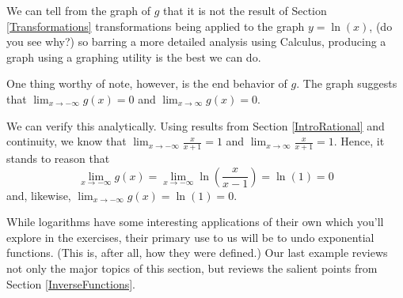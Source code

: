 \documentclass{ximera}
\begin{document}
\begin{example}
\begin{explanation}
\begin{enumerate}
We can tell from the graph of $g$ that it is not the result of Section \ref{Transformations} transformations being applied to the graph $y = \ln(x)$, (do you see why?)  so barring a more detailed analysis using Calculus, producing a graph using a graphing utility is the best we can do.  

One thing worthy of note, however, is the end behavior of $g$.  The graph suggests that $\lim_{x \rightarrow -\infty} g(x) = 0$ and  $\lim_{x \rightarrow \infty} g(x) = 0$.  

We can verify this analytically.  Using results  from Section \ref{IntroRational} and continuity, we know that $\lim_{x \rightarrow -\infty} \frac{x}{x+1} = 1$ and  $\lim_{x \rightarrow \infty} \frac{x}{x+1} = 1$.  Hence, it stands to reason that \[\lim_{x \rightarrow -\infty} g(x) = \lim_{x \rightarrow -\infty}  \ln \left(\frac{x}{x-1}\right) = \ln(1) = 0\] and, likewise,  $\lim_{x \rightarrow -\infty} g(x) = \ln(1) = 0$.  

\end{enumerate}
\end{explanation}

\end{example}

While logarithms have some interesting applications of their own which you'll explore in the exercises, their primary use to us will be to undo exponential functions. (This is, after all, how they were defined.)  Our last example  reviews not only the major topics of this section, but reviews the salient points from Section \ref{InverseFunctions}.
\end{document}
